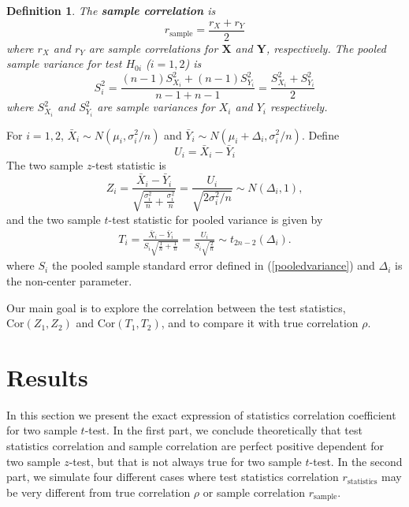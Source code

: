 \documentclass[12pt, a4paper]{article}
\newtheorem{definition}{Definition}     %
\begin{document}
	\begin{definition}
		The \textbf{sample correlation} is 
		\begin{equation}\label{rhosample}
			r_{\text{sample}}  = \frac{r_X + r_Y}{2}
		\end{equation}
		where $r_X$  and $r_Y$ are sample correlations for $\bm X$ and $\bm Y$, respectively.
		The pooled sample variance for test $H_{0i}$ ($i=1, 2$) is 
		\begin{equation}\label{pooledvariance}
			S_i^2 = \frac{(n-1)S_{X_i}^2 + (n-1)S_{Y_i}^2}{n-1 + n-1} = \frac{S_{X_i}^2 + S_{Y_i}^2}{2}
		\end{equation}
		where $S_{X_i}^2$ and $S_{Y_i}^2$ are sample variances for $X_i$ and $Y_i$ respectively.
	\end{definition} 
	
	
	For $i =1, 2$,  $\bar{X}_{i}\sim N(\mu_i, \sigma_i^2/n)$ and $\bar{Y}_{i}\sim N(\mu_i + \Delta_i,
	\sigma_i^2/n)$. Define
	\begin{equation}\label{expreU}
		U_i = \bar{X}_i - \bar{Y}_i
	\end{equation}
	The two sample $z$-test statistic is
	\begin{equation}\label{zTest}
		Z_i = \frac{\bar{X}_{i}-\bar{Y}_{i} }{\sqrt{\frac{\sigma^2_i}{n} + \frac{\sigma^2_i}{n}}} =
		\frac{U_i}{\sqrt{2\sigma_i^2/n}}\sim N(\Delta_i, 1) ,
	\end{equation}
	and the two sample $t$-test statistic for pooled variance is given by
	\begin{align}\label{t-test}
		T_i = \frac{\bar{X}_i - \bar{Y}_i}{S_i\sqrt{\frac{1}{n}+\frac{1}{n}}} =
		\frac{U_i}{S_i\sqrt{\frac{2}{n}}} \sim t_{2n-2}(\Delta_i). 
	\end{align}
	where $S_i$ the pooled sample standard error defined in (\ref{pooledvariance}) and $\Delta_i$ is the
	non-center parameter. 
	
	Our main goal is to explore the correlation between the test statistics, $\text{Cor}({Z_1, Z_2})$
	and $\text{Cor}({T_1, T_2})$, and to compare it with true correlation $\rho$. 
	
	
	
	\section{Results}
	
	In this section we present the exact expression of statistics correlation coefficient for two
	sample $t$-test. In the first part, we conclude theoretically that test statistics correlation and
	sample correlation are perfect positive dependent for two sample $z$-test, but that is not always
	true for two sample $t$-test. In the second part, we simulate four different cases where test
	statistics correlation $r_{\text{statistics}}$ may be very different from true correlation $\rho$ or
	sample correlation $r_{\text{sample}}$. 
\end{document}
